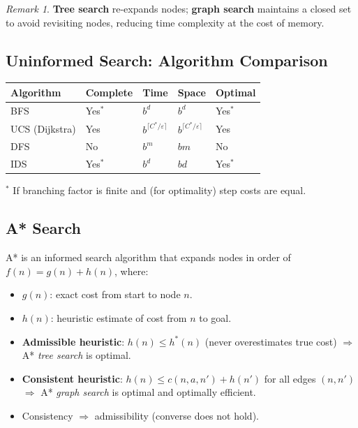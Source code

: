 \documentclass[11pt,a4paper]{article}
\theoremstyle{definition}
\theoremstyle{plain}
\theoremstyle{remark}
\newtheorem*{remark}{Remark}
\begin{document}
\begin{remark}
\textbf{Tree search} re-expands nodes; \textbf{graph search} maintains a closed set to avoid revisiting nodes, reducing time complexity at the cost of memory.
\end{remark}

\subsection{Uninformed Search: Algorithm Comparison}

\begin{center}
\begin{tabular}{lllll}
\hline
\textbf{Algorithm} & \textbf{Complete} & \textbf{Time} & \textbf{Space} & \textbf{Optimal} \\
\hline
BFS            & Yes$^*$  & $b^d$                        & $b^d$                        & Yes$^*$ \\
UCS (Dijkstra) & Yes      & $b^{\lceil C^*/\varepsilon \rceil}$ & $b^{\lceil C^*/\varepsilon \rceil}$ & Yes \\
DFS            & No       & $b^m$                        & $bm$                         & No \\
IDS            & Yes$^*$  & $b^d$                        & $bd$                         & Yes$^*$ \\
\hline
\end{tabular}
\end{center}
{\small $^*$ If branching factor is finite and (for optimality) step costs are equal.}

\subsection{A* Search}

A* is an informed search algorithm that expands nodes in order of $f(n) = g(n) + h(n)$, where:
\begin{itemize}
    \item $g(n)$: exact cost from start to node $n$.
    \item $h(n)$: heuristic estimate of cost from $n$ to goal.
\end{itemize}

\begin{tcolorbox}[colback=blue!5!white,colframe=blue!75!black,title=\textbf{A* Optimality Conditions}]
\begin{itemize}
    \item \textbf{Admissible heuristic}: $h(n) \le h^*(n)$ (never overestimates true cost) $\Rightarrow$ A* \emph{tree search} is optimal.
    \item \textbf{Consistent heuristic}: $h(n) \le c(n, a, n') + h(n')$ for all edges $(n, n')$ $\Rightarrow$ A* \emph{graph search} is optimal and optimally efficient.
    \item Consistency $\Rightarrow$ admissibility (converse does not hold).
\end{itemize}
\end{tcolorbox}
\end{document}
